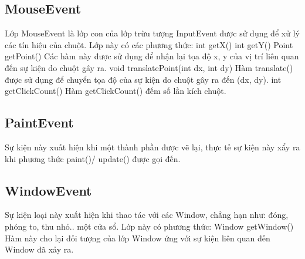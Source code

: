 \subsection{ MouseEvent}
Lớp MouseEvent là lớp con của lớp trừu tượng InputEvent được sử dụng để xử
lý các tín hiệu của chuột. Lớp này có các phương thức:
int getX()
int getY()
Point getPoint()
Các hàm này được sử dụng để nhận lại tọa độ x, y của vị trí liên quan đến
sự kiện do chuột gây ra.
void translatePoint(int dx, int dy)
Hàm translate() được sử dụng để chuyển tọa độ của sự kiện do chuột gây
ra đến (dx, dy).
int getClickCount()
Hàm getClickCount() đếm số lần kích chuột.
\subsection{ PaintEvent}
Sự kiện này xuất hiện khi một thành phần được vẽ lại, thực tế sự kiện này
xẩy ra khi phương thức paint()/ update() được gọi đến.
\subsection{ WindowEvent}
Sự kiện loại này xuất hiện khi thao tác với các Window, chẳng hạn như:
đóng, phóng to, thu nhỏ.. một cửa sổ. Lớp này có phương thức:
Window getWindow()
Hàm này cho lại đối tượng của lớp Window ứng với sự kiện liên quan đến
Window đã xảy ra.